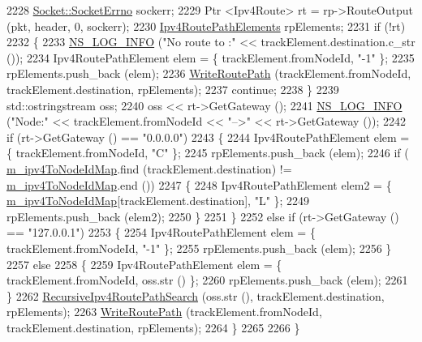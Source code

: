\begin{DoxyCode}
2228       \hyperlink{classns3_1_1Socket_ada1328c5ae0c28cb2a982caf8f6d6cca}{Socket::SocketErrno} sockerr;
2229       Ptr <Ipv4Route> rt = rp->RouteOutput (pkt, header, 0, sockerr);
2230       \hyperlink{classns3_1_1AnimationInterface_a7c7711cf651506df80a9eb3026603c52}{Ipv4RoutePathElements} rpElements;
2231       \textcolor{keywordflow}{if} (!rt)
2232         \{
2233           \hyperlink{group__logging_gafbd73ee2cf9f26b319f49086d8e860fb}{NS\_LOG\_INFO} (\textcolor{stringliteral}{"No route to :"} << trackElement.destination.c\_str ());
2234           Ipv4RoutePathElement elem = \{ trackElement.fromNodeId, \textcolor{stringliteral}{"-1"} \};
2235           rpElements.push\_back (elem);
2236           \hyperlink{classns3_1_1AnimationInterface_a372eeb3ffb6c70549acfe075d1725721}{WriteRoutePath} (trackElement.fromNodeId, trackElement.destination, rpElements);
2237           \textcolor{keywordflow}{continue};
2238         \}
2239       std::ostringstream oss;
2240       oss << rt->GetGateway ();
2241       \hyperlink{group__logging_gafbd73ee2cf9f26b319f49086d8e860fb}{NS\_LOG\_INFO} (\textcolor{stringliteral}{"Node:"} << trackElement.fromNodeId << \textcolor{stringliteral}{"-->"} << rt->GetGateway ()); 
2242       \textcolor{keywordflow}{if} (rt->GetGateway () == \textcolor{stringliteral}{"0.0.0.0"})
2243         \{
2244           Ipv4RoutePathElement elem = \{ trackElement.fromNodeId, \textcolor{stringliteral}{"C"} \};
2245           rpElements.push\_back (elem);
2246           \textcolor{keywordflow}{if} ( \hyperlink{classns3_1_1AnimationInterface_ae8061a2f8540660d0fa851e98d8c7565}{m\_ipv4ToNodeIdMap}.find (trackElement.destination) != 
      \hyperlink{classns3_1_1AnimationInterface_ae8061a2f8540660d0fa851e98d8c7565}{m\_ipv4ToNodeIdMap}.end ())
2247             \{
2248               Ipv4RoutePathElement elem2 = \{ \hyperlink{classns3_1_1AnimationInterface_ae8061a2f8540660d0fa851e98d8c7565}{m\_ipv4ToNodeIdMap}[trackElement.destination], \textcolor{stringliteral}{
      "L"} \};
2249               rpElements.push\_back (elem2);
2250             \}
2251         \}
2252       \textcolor{keywordflow}{else} \textcolor{keywordflow}{if} (rt->GetGateway () == \textcolor{stringliteral}{"127.0.0.1"})
2253         \{
2254           Ipv4RoutePathElement elem = \{ trackElement.fromNodeId, \textcolor{stringliteral}{"-1"} \};
2255           rpElements.push\_back (elem);
2256         \}
2257       \textcolor{keywordflow}{else}
2258         \{
2259           Ipv4RoutePathElement elem = \{ trackElement.fromNodeId, oss.str () \};
2260           rpElements.push\_back (elem);
2261         \}
2262       \hyperlink{classns3_1_1AnimationInterface_acbffe52eaabf803a624ba0452b226017}{RecursiveIpv4RoutePathSearch} (oss.str (), trackElement.destination, 
      rpElements);
2263       \hyperlink{classns3_1_1AnimationInterface_a372eeb3ffb6c70549acfe075d1725721}{WriteRoutePath} (trackElement.fromNodeId, trackElement.destination, rpElements);
2264     \}
2265 
2266 \}
\end{DoxyCode}


